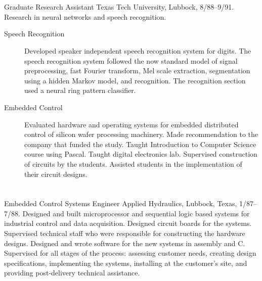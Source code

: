 \documentclass[11pt]{resume}
\begin{document}
 \section{}
  {Graduate Research Assistant}
   {Texas Tech University, Lubbock,  8/88--9/91. Research
  in neural networks and speech recognition.}
\begin{description}
      \item[Speech Recognition] Developed speaker independent speech
      recognition system for digits.  The speech recognition system
      followed the now standard model of signal preprocessing, fast
      Fourier transform, Mel scale extraction, segmentation using a
      hidden Markov model, and recognition.  The recognition section
      used a neural ring pattern classifier.  
      \item[Embedded Control] Evaluated hardware and
      operating systems for embedded distributed control of silicon
      wafer processing machinery.  Made recommendation to the
      company that funded the study.  Taught Introduction to
      Computer Science course using Pascal.  Taught digital
      electronics lab.  Supervised construction of circuits by the
      students.  Assisted students in the implementation of their
      circuit designs.  \end{description}

   
\section{}{Embedded Control Systems Engineer} {Applied
  Hydraulics, Lubbock, Texas, 1/87--7/88.  Designed and built
  microprocessor and sequential logic based systems for industrial control
  and data acquisition. 
  Designed circuit boards for the systems.
  Supervised technical staff who were responsible for constructing
  the hardware designs.  Designed and wrote software for the new
  systems in assembly and C.  Supervised for all stages of
  the process: assessing customer needs, creating design
  specifications, implementing the systems, installing at the
  customer's site, and providing post-delivery technical
  assistance.}
\end{document}
